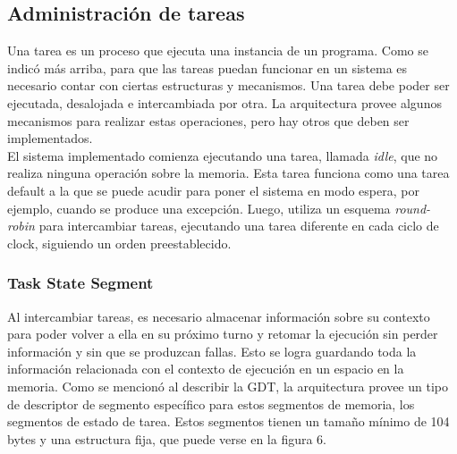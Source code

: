 \documentclass[a4paper]{article}
\begin{document}
\subsection{Administración de tareas}
Una tarea es un proceso que ejecuta una instancia de un programa. Como se indicó más arriba, para que las tareas puedan funcionar en un sistema es necesario contar con ciertas estructuras y mecanismos. Una tarea debe poder ser ejecutada, desalojada e intercambiada por otra. La arquitectura provee algunos mecanismos para realizar estas operaciones, pero hay otros que deben ser implementados. \\
El sistema implementado comienza ejecutando una tarea, llamada \textit{idle}, que no realiza ninguna operación sobre la memoria. Esta tarea funciona como una tarea default a la que se puede acudir para poner el sistema en modo espera, por ejemplo, cuando se produce una excepción. Luego, utiliza un esquema \textit{round-robin} para intercambiar tareas, ejecutando una tarea diferente en cada ciclo de clock, siguiendo un orden preestablecido.

\subsubsection{Task State Segment}
Al intercambiar tareas, es necesario almacenar información sobre su contexto para poder volver a ella en su próximo turno y retomar la ejecución sin perder información y sin que se produzcan fallas. Esto se logra guardando toda la información relacionada con el contexto de ejecución en un espacio en la memoria. Como se mencionó al describir la GDT, la arquitectura provee un tipo de descriptor de segmento específico para estos segmentos de memoria, los segmentos de estado de tarea. Estos segmentos tienen un tamaño mínimo de 104 bytes y una estructura fija, que puede verse en la figura 6.
\end{document}
